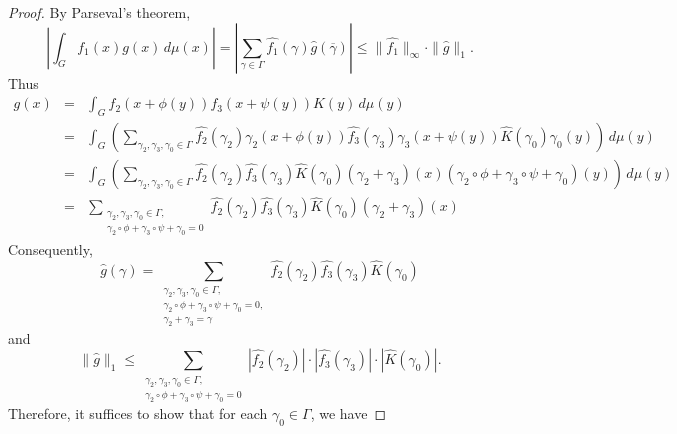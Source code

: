\begin{proof}
By Parseval's theorem,
\begin{equation*} %
\left| \int_G f_1(x) g(x) \, d\mu(x) \right|= \left| \sum_{\gamma \in \Gamma} \widehat{f_1}(\gamma) \widehat{g} (\overline{\gamma}) \right| \leq \| \widehat{f_1} \|_{\infty} \cdot \| \widehat{g} \|_1.
\end{equation*} 
Thus
\begin{eqnarray*}
g(x) &=& \int_{G} f_2(x+ \phi(y)) f_3(x+ \psi(y)) K(y) \, d\mu(y) \nonumber \\
&=& \int_G \left( \sum_{\gamma_2, \gamma_3, \gamma_0 \in \Gamma} \widehat{f_2}(\gamma_2) \gamma_2(x+ \phi(y)) \widehat{f_3}(\gamma_3) \gamma_3(x+ \psi(y)) \widehat{K}(\gamma_0) \gamma_0(y) \right) \, d\mu(y) \nonumber \\
&=& \int_G \left( \sum_{\gamma_2, \gamma_3, \gamma_0 \in \Gamma} \widehat{f_2}(\gamma_2) \widehat{f_3}(\gamma_3) \widehat{K}(\gamma_0) (\gamma_2 + \gamma_3)(x) (\gamma_2 \circ \phi +  \gamma_3 \circ \psi + \gamma_0 ) (y)\right) \, d\mu(y) \nonumber \\
&=&  \sum_{\substack{ \gamma_2, \gamma_3, \gamma_0 \in \Gamma,\\ \gamma_2 \circ \phi + \gamma_3 \circ \psi + \gamma_0=0}} \widehat{f_2}(\gamma_2) \widehat{f_3}(\gamma_3) \widehat{K}(\gamma_0) (\gamma_2 + \gamma_3)(x) %
\end{eqnarray*}
Consequently,
\begin{equation*} %
\widehat{g}(\gamma) = \sum_{\substack{ \gamma_2, \gamma_3, \gamma_0 \in \Gamma,\\ \gamma_2 \circ \phi + \gamma_3 \circ \psi + \gamma_0=0, \\ \gamma_2 + \gamma_3 = \gamma}} 
\widehat{f_2}(\gamma_2) \widehat{f_3}(\gamma_3) \widehat{K}(\gamma_0) 
\end{equation*}
and
\begin{equation*} %
\lVert \widehat{g} \rVert_1 \leq \sum_{\substack{ \gamma_2, \gamma_3, \gamma_0 \in \Gamma,\\ \gamma_2 \circ \phi + \gamma_3 \circ \psi + \gamma_0=0}} |\widehat{f_2}(\gamma_2) | \cdot | \widehat{f_3}(\gamma_3) | \cdot 
| \widehat{K}(\gamma_0) |.
\end{equation*}
Therefore, it suffices to show that for each $\gamma_0 \in \Gamma$, we have

\end{proof}
